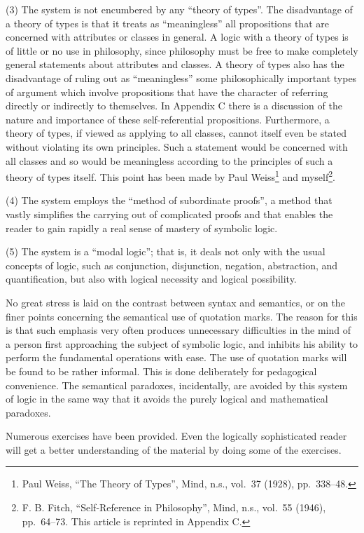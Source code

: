 \documentclass{book}
\begin{document}
(3) The system is not encumbered by any “theory of types”.  The disadvantage of a theory of types is that it treats as “meaningless” all propositions that are concerned with attributes or classes in general.  A logic with a theory of types is of little or no use in philosophy, since philosophy must be free to make completely general statements about attributes and classes.  A theory of types also has the disadvantage of ruling out as “meaningless” some philosophically important types of argument which involve propositions that have the character of referring directly or indirectly to themselves.  In Appendix C there is a discussion of the nature and importance of these self-referential propositions.  Furthermore, a theory of types, if viewed as applying to all classes, cannot itself even be stated without violating its own principles.  Such a statement would be concerned with all classes and so would be meaningless according to the principles of such a theory of types itself.  This point has been made by Paul Weiss\footnote{Paul Weiss, “The Theory of Types”, Mind, n.s., vol.\ 37 (1928), pp.\ 338–48.} and myself\footnote{F. B. Fitch, “Self-Reference in Philosophy”, Mind, n.s., vol.\ 55 (1946), pp.\ 64–73.  This article is reprinted in Appendix C.}.

(4) The system employs the “method of subordinate proofs”, a method that vastly simplifies the carrying out of complicated proofs and that enables the reader to gain rapidly a real sense of mastery of symbolic logic.

(5) The system is a “modal logic”; that is, it deals not only with the usual concepts of logic, such as conjunction, disjunction, negation, abstraction, and quantification, but also with logical necessity and logical possibility.

No great stress is laid on the contrast between syntax and semantics, or on the finer points concerning the semantical use of quotation marks.  The reason for this is that such emphasis very often produces unnecessary difficulties in the mind of a person first approaching the subject of symbolic logic, and inhibits his ability to perform the fundamental operations with ease.  The use of quotation marks will be found to be rather informal.  This is done deliberately for pedagogical convenience.  The semantical paradoxes, incidentally, are avoided by this system of logic in the same way that it avoids the purely logical and mathematical paradoxes.

Numerous exercises have been provided. Even the logically sophisticated reader will get a better understanding of the material by doing some of the exercises.
\end{document}
